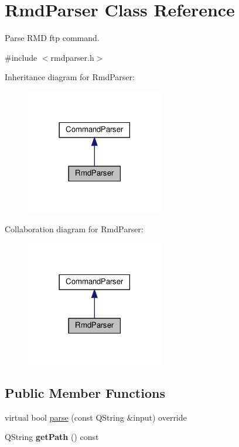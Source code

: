 \hypertarget{classRmdParser}{}\section{Rmd\+Parser Class Reference}
\label{classRmdParser}


Parse R\+MD ftp command.  




{\ttfamily \#include $<$rmdparser.\+h$>$}



Inheritance diagram for Rmd\+Parser\+:\nopagebreak
\begin{figure}[H]
\begin{center}
\leavevmode
\includegraphics[width=170pt]{d9/d6b/classRmdParser__inherit__graph}
\end{center}
\end{figure}


Collaboration diagram for Rmd\+Parser\+:\nopagebreak
\begin{figure}[H]
\begin{center}
\leavevmode
\includegraphics[width=170pt]{d9/d81/classRmdParser__coll__graph}
\end{center}
\end{figure}
\subsection*{Public Member Functions}
\begin{DoxyCompactItemize}
\item 
virtual bool \hyperlink{classRmdParser_a19bc9f3a082934c2e8eb9eb8d8aee5f3}{parse} (const Q\+String \&input) override
\item 
\mbox{\label{classRmdParser_aa8ab8c033c2d07fd6ac85fbca0381905}} 
Q\+String {\bfseries get\+Path} () const
\end{DoxyCompactItemize}


